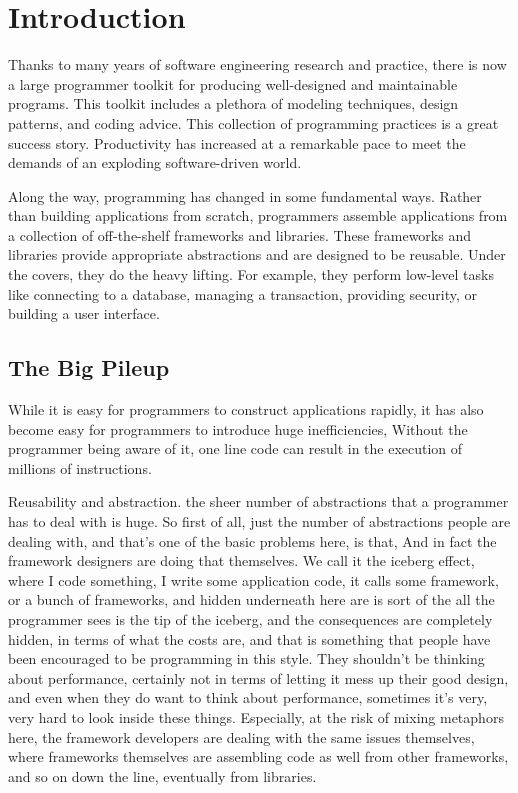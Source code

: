 
\chapter{Introduction}

Thanks to many years of software engineering research and practice, there is now a large programmer toolkit for producing well-designed and maintainable programs. This toolkit includes a plethora of modeling techniques, design patterns, and coding advice. This collection of programming practices is a great success story. Productivity has increased at a remarkable pace to meet the demands of an exploding software-driven world. 

Along the way, programming has changed in some fundamental ways. Rather than building applications from scratch, programmers assemble applications from a collection of off-the-shelf frameworks and libraries. These frameworks and libraries provide appropriate abstractions and are designed to be reusable. Under the covers, they do the heavy lifting. For example, they perform low-level tasks like connecting to a database, managing a transaction, providing security, or building a user interface. 




\section{The Big Pileup}

While it is easy for programmers to construct applications rapidly, it has also become easy for programmers to  
introduce huge inefficiencies, Without the programmer being aware of it, one line code can result in the execution of millions of instructions. 

Reusability and abstraction.
the sheer number of abstractions that a programmer has to deal with is huge. 
So first of all, just the number of abstractions people are dealing with, and that's one of the basic problems here, is that, 
And in fact the framework designers are doing that themselves.  We call it the iceberg effect, where I code something, I write some application code, it calls some framework, or a bunch of frameworks, and hidden underneath here are is sort of the all the programmer sees is the tip of the iceberg, and the consequences are completely hidden, in terms of what the costs are, and that is something that people have been encouraged to be programming in this style. They shouldn't be thinking about performance, certainly not in terms of letting it mess up their good design, and even when they do want to think about performance, sometimes it's very, very hard to look inside these things.  Especially, at the risk of mixing metaphors here, the framework developers are dealing with the same issues themselves, where frameworks themselves are assembling code as well from other frameworks, and so on down the line, eventually from libraries.

